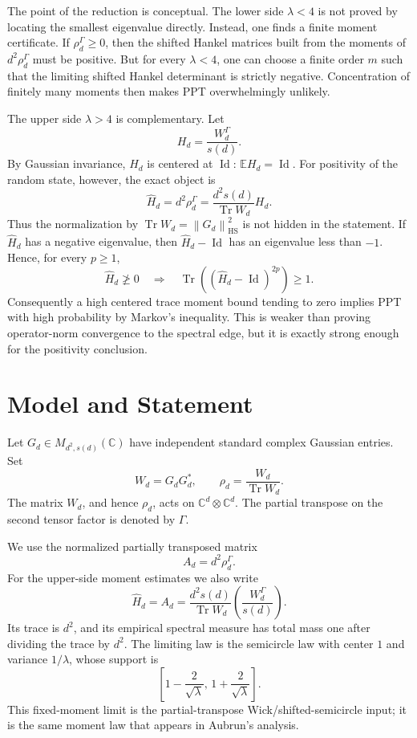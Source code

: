 \documentclass[11pt,reqno]{amsart}
\newcommand{\C}{\mathbb C}
\newcommand{\EE}{\mathbb E}
\newcommand{\Tr}{\operatorname{Tr}}
\newcommand{\Id}{\operatorname{Id}}
\newcommand{\HS}{\mathrm{HS}}
\newcommand{\norm}[1]{\left\lVert #1\right\rVert}
\begin{document}
The point of the reduction is conceptual.  The lower side
\(\lambda<4\) is not proved by locating the smallest eigenvalue directly.
Instead, one finds a finite moment certificate.  If \(\rho_d^\Gamma\ge0\),
then the shifted Hankel matrices built from the moments of
\(d^2\rho_d^\Gamma\) must be positive.  But for every \(\lambda<4\), one can
choose a finite order \(m\) such that the limiting shifted Hankel determinant
is strictly negative.  Concentration of finitely many moments then makes PPT
overwhelmingly unlikely.

The upper side \(\lambda>4\) is complementary.  Let
\[
  H_d=\frac{W_d^\Gamma}{s(d)}.
\]
By Gaussian invariance, \(H_d\) is centered at \(\Id\): \(\EE H_d=\Id\).
For positivity of the random state, however, the exact object is
\[
  \widehat H_d=d^2\rho_d^\Gamma
  =
  \frac{d^2s(d)}{\Tr W_d}H_d.
\]
Thus the normalization by \(\Tr W_d=\norm{G_d}_{\HS}^2\) is not hidden in
the statement.  If \(\widehat H_d\) has a negative eigenvalue, then
\(\widehat H_d-\Id\) has an eigenvalue less than \(-1\).  Hence, for every
\(p\ge1\),
\[
  \widehat H_d\ngeq0
  \quad\Longrightarrow\quad
  \Tr\left((\widehat H_d-\Id)^{2p}\right)\ge1.
\]
Consequently a high centered trace moment bound tending to zero implies PPT
with high probability by Markov's inequality.  This is weaker than proving
operator-norm convergence to the spectral edge, but it is exactly strong
enough for the positivity conclusion.

\section{Model and Statement}

Let \(G_d\in M_{d^2,s(d)}(\C)\) have independent standard complex Gaussian
entries.  Set
\[
  W_d=G_dG_d^*,
  \qquad
  \rho_d=\frac{W_d}{\Tr W_d}.
\]
The matrix \(W_d\), and hence \(\rho_d\), acts on
\(\C^d\otimes\C^d\).  The partial transpose on the second tensor factor is
denoted by \(\Gamma\).

We use the normalized partially transposed matrix
\[
  A_d=d^2\rho_d^\Gamma.
\]
For the upper-side moment estimates we also write
\[
  \widehat H_d=A_d
  =
  \frac{d^2s(d)}{\Tr W_d}
  \left(\frac{W_d^\Gamma}{s(d)}\right).
\]
Its trace is \(d^2\), and its empirical spectral measure has total mass one
after dividing the trace by \(d^2\).  The limiting law is the semicircle law
with center \(1\) and variance \(1/\lambda\), whose support is
\[
  \left[1-\frac{2}{\sqrt\lambda},\,1+\frac{2}{\sqrt\lambda}\right].
\]
This fixed-moment limit is the partial-transpose Wick/shifted-semicircle
input; it is the same moment law that appears in Aubrun's analysis.
\end{document}
